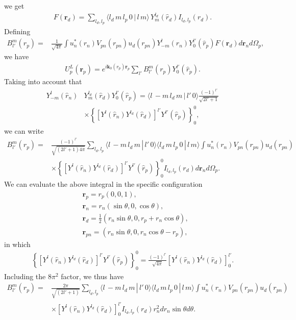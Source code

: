 \documentclass[a4paper,11pt]{article}
\begin{document}
 we get
 \begin{align}\label{eq75}
 F(\mathbf r_d)=\sum_{l_d,l_p} \langle l_d\,m\,l_p\,0\,|\,l\,m\rangle\,Y^{l_d}_m(\hat r_d)I_{l_d,l_p}(r_d).
 \end{align} 
 Defining
 \begin{align}\label{eq54}
  B_{l'}^m(r_p)=
 &\frac{1}{\sqrt{4\pi}}\int u_n^*(r_n)V_{pn}(r_{pn})u_d(r_{pn})  Y^{l}_{-m}(\hat r_n)Y^{l'}_0(\hat r_p)F(\mathbf r_d) d\mathbf r_nd\Omega_p,
 \end{align} 
 we have
 \begin{align}\label{eq53}
  U^L_p(\mathbf r_p)=e^{i\mathbf k_0(r_p)\mathbf r_p}\sum_{l'}B^m_{l'}(r_p)Y_0^{l'}(\hat r_p).
 \end{align}
 Taking into account that
  \begin{align}\label{eq76}
 \nonumber Y^{l}_{-m}(\hat r_n)&Y^{l_d}_m(\hat r_d)Y^{l'}_0(\hat r_p)=\langle l\,-m\,l_d\,m\,|\,l'\,0\rangle\frac{(-1)^{l'}}{\sqrt{2l'+1}}\\
 &\times\left\{\left[Y^{l}(\hat r_n)Y^{l_d}(\hat r_d)\right]^{l'}Y^{l'}(\hat r_p)\right\}^0_0,
  \end{align}
we can write
 \begin{align}\label{eq55}
 \nonumber  B_{l'}^m(r_p)=&\frac{(-1)^{l'}}{\sqrt{(2l'+1)4\pi}}\sum_{l_d,l_p}\langle l\,-m\,l_d\,m\,|\,l'\,0\rangle\langle l_d\,m\,l_p\,0\,|\,l\,m\rangle\int u_n^*(r_n)V_{pn}(r_{pn})u_d(r_{pn})\\
 &\times  \left\{\left[Y^{l}(\hat r_n)Y^{l_d}(\hat r_d)\right]^{l'}Y^{l'}(\hat r_p)\right\}^0_0 I_{l_d,l_p}(r_d)d\mathbf r_nd\Omega_p.
 \end{align}
 We can evaluate the above integral in the specific configuration
 \begin{align}\label{eq77}
 \nonumber&\mathbf r_p=r_p\left(0,0,1\right),\\
 \nonumber&\mathbf r_{n}=r_{n}\left(\sin\theta,0,\cos\theta\right),\\
 \nonumber &\mathbf r_{d}=\frac{1}{2}\left(r_{n}\sin\theta,0,r_p+r_{n}\cos\theta\right),\\
&\mathbf r_{pn}=\left(r_{n}\sin\theta,0,r_{n}\cos\theta-r_p\right),
 \end{align}
 in which
 \begin{align}\label{eq78}
  \left\{\left[Y^{l}(\hat r_n)Y^{l_d}(\hat r_d)\right]^{l'}Y^{l'}(\hat r_p)\right\}^0_0=\frac{(-1)^{l'}}{\sqrt{4\pi}}\left[Y^{l}(\hat r_n)Y^{l_d}(\hat r_d)\right]^{l'}_0.
 \end{align}
 Including the $8\pi^2$ factor, we thus have 
  \begin{align}\label{eq56}
  \nonumber B^m_{l'}(r_p)=&\frac{2\pi}{\sqrt{(2l'+1)}}\sum_{l_d,l_p}\langle l\,-m\,l_d\,m\,|\,l'\,0\rangle\langle l_d\,m\,l_p\,0\,|\,l\,m\rangle\int u_n^*(r_n)V_{pn}(r_{pn})u_d(r_{pn})\\
  &\times  \left[Y^{l}(\hat r_n)Y^{l_d}(\hat r_d)\right]^{l'}_0 I_{l_d,l_p}(r_d)r^2_n d r_n \sin\theta d\theta.
  \end{align}
\end{document}
